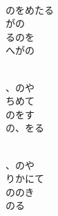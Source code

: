\documentclass[10pt,b5j]{tarticle} %
\begin{document}
\vspace{1.5em} %
\newcommand{\linespace}{0.5em} %
\newcommand{\blocksize}{0.5\hsize} %
\newcommand{\itemmargin}{3em} %
\begin{enumerate} %
    \setlength{\itemindent}{\itemmargin} %
    \begin{minipage}[c]{\blocksize}
    
        \vspace{\linespace}
        \item~\\
        のをめたる\\
        がの\\
        るのを\\
        へがの
        
    \end{minipage}
    \begin{minipage}[c]{\blocksize}
        
        \vspace{\linespace}
        \item~\\
        、のや\\
        ちめて\\
        のをす\\
        の、をる
        
    \end{minipage}
    \begin{minipage}[c]{\blocksize}
        
        \vspace{\linespace}
        \item~\\
        、のや\\
        りかにて\\
        ののき\\
        のる
        

\end{minipage}
\end{enumerate}
\end{document}
